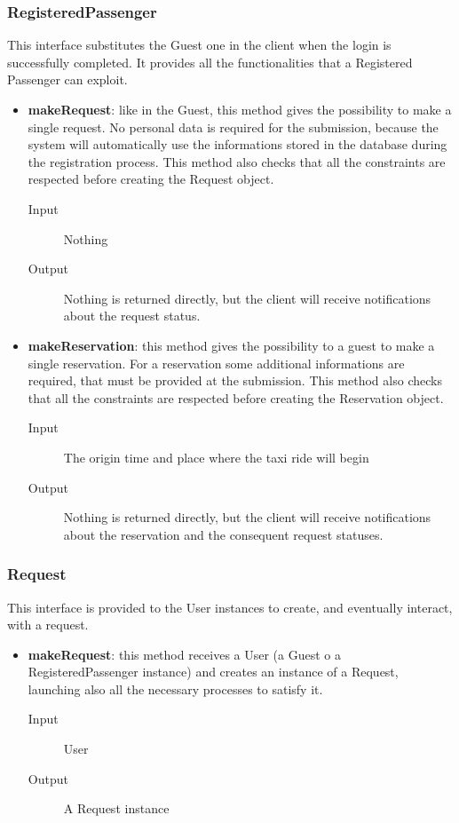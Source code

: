 		\subsubsection{RegisteredPassenger}
		This interface substitutes the Guest one in the client when the login is successfully completed.
		It provides all the	functionalities that a Registered Passenger can exploit.
		\begin{itemize}
			\item \textbf{makeRequest}: like in the Guest, this method gives the possibility to make a single request.
			No personal data is required for the submission, because the system will automatically use the
			informations stored in the database during the registration process. This method also checks that
			all the constraints are respected before creating the Request object.
			\begin{description}
				\item[Input] Nothing
				\item[Output] Nothing is returned directly, but the client will receive notifications about the
				request status.
			\end{description}
			\item \textbf{makeReservation}: this method gives the possibility to a guest to make a single reservation.
			For a reservation some additional informations are required, that must be provided at the submission.
			This method also checks that all the constraints are respected before creating the Reservation object.
			\begin{description}
				\item[Input] The origin time and place where the taxi ride will begin
				\item[Output] Nothing is returned directly, but the client will receive notifications about the
				reservation and the consequent request statuses.
			\end{description}
		\end{itemize}
		\subsubsection{Request}
		This interface is provided to the User instances to create, and eventually interact, with a request.
		\begin{itemize}
			\item \textbf{makeRequest}: this method receives a User (a Guest o a RegisteredPassenger instance)
			and creates	an instance of a Request, launching also all the necessary processes to satisfy it.
			\begin{description}
				\item[Input] User
				\item[Output] A Request instance
			\end{description}
		\end{itemize}
